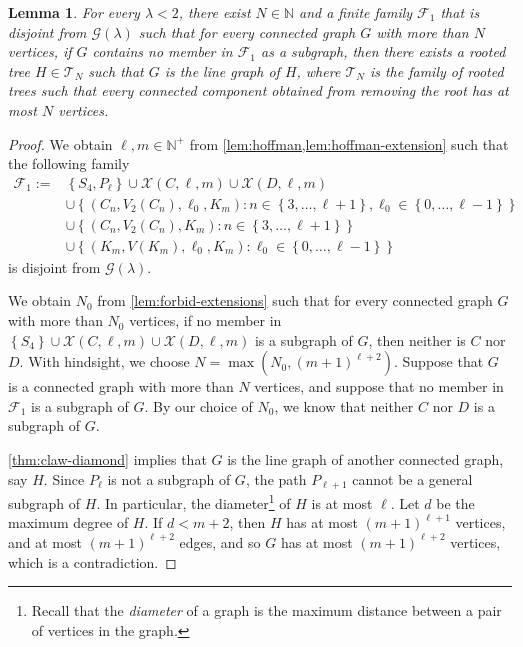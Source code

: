 \documentclass[11pt]{article}
\newtheorem{lemma}[theorem]{Lemma}
\theoremstyle{definition}
\theoremstyle{remark}
\newcommand{\dset}[2]{\left\{{#1}\colon{#2}\right\}}
\newcommand{\sset}[1]{\left\{{#1}\right\}}
\newcommand{\la}{\lambda}
\newcommand{\F}{\mathcal{F}}
\newcommand{\G}{\mathcal{G}}
\newcommand{\N}{\mathbb{N}}
\newcommand{\X}{\mathcal{X}}
\newcommand{\Gl}{\G(\la)}
\begin{document}
\begin{lemma} \label{lem:line-graph-of-tn}
    For every $\la < 2$, there exist $N \in \N$ and a finite family $\F_1$ that is disjoint from $\Gl$ such that for every connected graph $G$ with more than $N$ vertices, if $G$ contains no member in $\F_1$ as a subgraph, then there exists a rooted tree $H \in \mathcal{T}_N$ such that $G$ is the line graph of $H$, where $\mathcal{T}_N$ is the family of rooted trees such that every connected component obtained from removing the root has at most $N$ vertices.
\end{lemma}

\begin{proof}
    We obtain $\ell, m \in \N^+$ from \cref{lem:hoffman,lem:hoffman-extension} such that the following family
    \begin{align*}
        \F_1 := & \sset{S_4, P_\ell} \cup \X(C, \ell, m) \cup \X(D, \ell, m) \\
        & \cup \dset{(C_n, V_2(C_n), \ell_0, K_m)}{n \in \sset{3, \dots, \ell + 1}, \ell_0 \in \sset{0, \dots, \ell - 1}} \\
        & \cup \dset{(C_n, V_2(C_n), K_m)}{n \in \sset{3, \dots, \ell + 1}} \\
        & \cup \dset{(K_m, V(K_m), \ell_0, K_m)}{\ell_0 \in \sset{0, \dots, \ell-1}}
    \end{align*}
    is disjoint from $\Gl$.

    \label{proof:main1-claim-start}
    We obtain $N_0$ from \cref{lem:forbid-extensions} such that for every connected graph $G$ with more than $N_0$ vertices, if no member in $\sset{S_4} \cup \X(C, \ell, m) \cup \X(D, \ell, m)$ is a subgraph of $G$, then neither is $C$ nor $D$. With hindsight, we choose $N = \max(N_0, (m+1)^{\ell+2})$. Suppose that $G$ is a connected graph with more than $N$ vertices, and suppose that no member in $\F_1$ is a subgraph of $G$. By our choice of $N_0$, we know that neither $C$ nor $D$ is a subgraph of $G$.
    
    \cref{thm:claw-diamond} implies that $G$ is the line graph of another connected graph, say $H$. Since $P_\ell$ is not a subgraph of $G$, the path $P_{\ell + 1}$ cannot be a general subgraph of $H$. In particular, the diameter\footnote{Recall that the \emph{diameter} of a graph is the maximum distance between a pair of vertices in the graph.} of $H$ is at most $\ell$. Let $d$ be the maximum degree of $H$. If $d < m + 2$, then $H$ has at most $(m+1)^{\ell+1}$ vertices, and at most $(m+1)^{\ell+2}$ edges, and so $G$ has at most $(m+1)^{\ell+2}$ vertices, which is a contradiction.
    

\end{proof}
\end{document}
